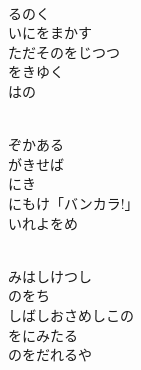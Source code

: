 \documentclass[10pt,b5j]{tarticle} %
\begin{document}
\vspace{1.5em} %
\newcommand{\linespace}{0.5em} %
\newcommand{\blocksize}{0.5\hsize} %
\newcommand{\itemmargin}{3em} %
\begin{enumerate} %
    \setlength{\itemindent}{\itemmargin} %
    \begin{minipage}[c]{\blocksize}
    
        \vspace{\linespace}
        \item~\\
        るのく\\
        いにをまかす\\
        ただそのをじつつ\\
        をきゆく\\
        はの
        
    \end{minipage}
    \begin{minipage}[c]{\blocksize}
        
        \vspace{\linespace}
        \item~\\
        ぞかある\\
        がきせば\\
        にき\\
        にもけ「バンカラ!」\\
        いれよをめ
        
    \end{minipage}
    \begin{minipage}[c]{\blocksize}
        
        \vspace{\linespace}
        \item~\\
        みはしけつし\\
        のをち\\
        しばしおさめしこの\\
        をにみたる\\
        のをだれるや
    
    \end{minipage}
\end{enumerate} %
\end{document}
